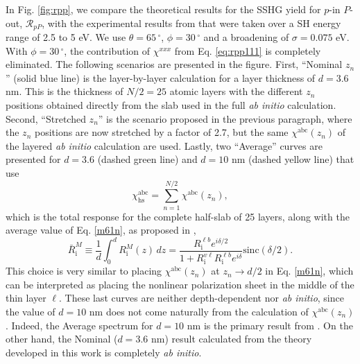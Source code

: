 \documentclass[utf8]{frontiersSCNS}
\begin{document}
In Fig. \ref{fig:rpp}, we compare the theoretical results for the SSHG yield for
$p$-in $P$-out, $\mathcal{R}_{pP}$, with the experimental results from
\cite{mejiaPRB02} that were taken over a SH energy range of 2.5 to 5 eV. We use
$\theta=65\,^{\circ}$, $\phi = 30\,^{\circ}$ and a broadening of $\sigma =
0.075$ eV. With $\phi = 30\,^{\circ}$, the contribution of $\chi^{xxx}$ from Eq.
\eqref{eq:rpp111} is completely eliminated. The following scenarios are
presented in the figure. First, ``Nominal $z_{n}$'' (solid blue line) is the
layer-by-layer calculation for a layer thickness of $d = 3.6$ nm. This is the
thickness of $N/2=25$ atomic layers with the different $z_{n}$ positions
obtained directly from the slab used in the full \emph{ab initio} calculation.
Second, ``Stretched $z_{n}$'' is the scenario proposed in the previous
paragraph, where the $z_{n}$ positions are now stretched by a factor of 2.7, but
the same $\chi^{\mathrm{abc}}(z_{n})$ of the layered \emph{ab initio}
calculation are used. Lastly, two ``Average'' curves are presented for $d = 3.6$
(dashed green line) and $d = 10$ nm (dashed yellow line) that use
\begin{equation}\label{zp.60}
\chi^{\mathrm{abc}}_{\mathrm{hs}}
=\sum_{n=1}^{N/2}
\chi^{\mathrm{abc}}(z_{n}) ,
\end{equation}  
which is the total response for the complete half-slab of 25 layers, along with
the average value of Eq. \eqref{m61n}, as proposed in
\cite{andersonPRB16b},
\begin{equation}\label{rave}
\bar{R}^{M}_{\mathrm{i}}
\equiv\frac{1}{d}\int^d_0 R^{M}_{\mathrm{i}}(z)\,dz  = 
\frac{R^{\ell b}_{\mathrm{i}}e^{i\delta/2}}
     {1+R^{v\ell}_{\mathrm{i}} R^{\ell b}_{\mathrm{i}}e^{i\delta}}
\mathrm{sinc}(\delta/2).
\end{equation} 
This choice is very similar to placing $\chi^{\mathrm{abc}}(z_{n})$ at $z_{n}
\to d/2$ in Eq. \eqref{m61n}, which can be interpreted as placing the nonlinear
polarization sheet in the middle of the thin layer $\ell$. These last curves are
neither depth-dependent nor \emph{ab initio}, since the value of $d = 10$ nm
does not come naturally from the calculation of $\chi^{\mathrm{abc}}(z_{n})$.
Indeed, the Average spectrum for $d = 10$ nm is the primary result from
\cite{andersonPRB16b}. On the other hand, the Nominal ($d = 3.6$ nm) result
calculated from the theory developed in this work is completely \emph{ab
initio}.
\end{document}
